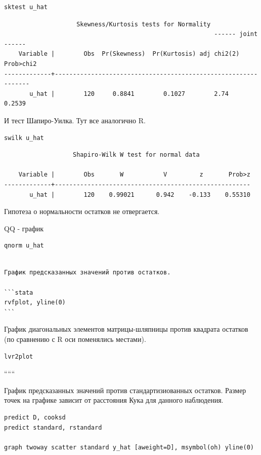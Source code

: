 \documentclass[]{book}
\begin{document}
\begin{verbatim}
sktest u_hat
\end{verbatim}

\begin{verbatim}
                    Skewness/Kurtosis tests for Normality
                                                          ------ joint ------
    Variable |        Obs  Pr(Skewness)  Pr(Kurtosis) adj chi2(2)   Prob>chi2
-------------+---------------------------------------------------------------
       u_hat |        120     0.8841        0.1027        2.74         0.2539
\end{verbatim}

И тест Шапиро-Уилка. Тут все аналогично R.

\begin{verbatim}
swilk u_hat
\end{verbatim}

\begin{verbatim}
                   Shapiro-Wilk W test for normal data

    Variable |        Obs       W           V         z       Prob>z
-------------+------------------------------------------------------
       u_hat |        120    0.99021      0.942    -0.133    0.55310
\end{verbatim}

Гипотеза о нормальности остатков не отвергается.

QQ - график

\begin{verbatim}
qnorm u_hat 
\end{verbatim}

\begin{verbatim}

График предсказанных значений против остатков.

```stata
rvfplot, yline(0)
```
\end{verbatim}

График диагональных элементов матрицы-шляпницы против квадрата остатков (по сравнению с R оси поменялись местами).

\begin{verbatim}
lvr2plot
\end{verbatim}

``````

График предсказанных значений против стандартизиованных остатков. Размер точек на графике зависит от расстояния Кука для данного наблюдения.

\begin{verbatim}
predict D, cooksd
predict standard, rstandard

graph twoway scatter standard y_hat [aweight=D], msymbol(oh) yline(0)
\end{verbatim}
\end{document}

